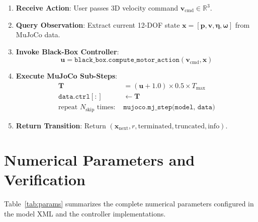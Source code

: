 \documentclass[11pt,a4paper]{article}
\begin{document}
\begin{tcolorbox}[title=Algorithm 1: SingleIntegratorQuadrotorEnv.step(v\_cmd)]
\label{alg:wrapper}
\begin{enumerate}
    \item \textbf{Receive Action}: User passes 3D velocity command $\mathbf{v}_{\mathrm{cmd}} \in \mathbb{R}^3$.
    \item \textbf{Query Observation}: Extract current 12-DOF state $\mathbf{x} = [\mathbf{p}, \mathbf{v}, \boldsymbol{\eta}, \boldsymbol{\omega}]$ from MuJoCo data.
    \item \textbf{Invoke Black-Box Controller}:
    \begin{equation*}
    \mathbf{u} = \texttt{black\_box.compute\_motor\_action}(\mathbf{v}_{\mathrm{cmd}}, \mathbf{x})
    \end{equation*}
    \item \textbf{Execute MuJoCo Sub-Steps}:
    \begin{align*}
    \mathbf{T} &= (\mathbf{u} + 1.0) \times 0.5 \times T_{\max} \\
    \texttt{data.ctrl}[:] &\leftarrow \mathbf{T} \\
    \text{repeat } N_{\mathrm{skip}} \text{ times: } &\texttt{mujoco.mj\_step(model, data)}
    \end{align*}
    \item \textbf{Return Transition}: Return $(\mathbf{x}_{\mathrm{next}}, r, \text{terminated}, \text{truncated}, \text{info})$.
\end{enumerate}
\end{tcolorbox}

\section{Numerical Parameters and Verification}

Table~\ref{tab:params} summarizes the complete numerical parameters configured in the model XML and the controller implementations.
\end{document}
